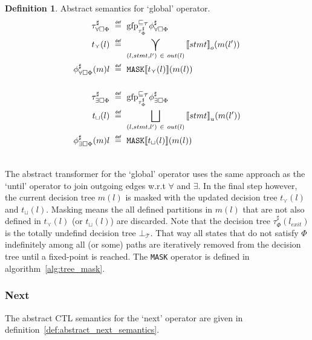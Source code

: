 \documentclass[11pt,a4paper,titlepage]{article}
\theoremstyle{definition}
\newtheorem{definition}{Definition}[section]
\newcommand\eqdef{\mathrel{\overset{\makebox[0pt]{\mbox{\normalfont\tiny\sffamily def}}}{=}}}
\begin{document}
\begin{definition}\label{def:abstract_global_semantics}
    Abstract semantics for `global' operator.
    \setlength{\jot}{15pt}
    \begin{align*}
        \tau^\sharp_{\forall\square\Phi} \ &\eqdef \ \text{gfp}^{\sqsubseteq_{\mathcal{T}}}_{\tau^\sharp_\Phi} \phi^\sharp_{\forall\square\Phi}\\
        t_{\curlyvee}(l)  \ &\eqdef \ \bigcurlyvee\limits_{(l, stmt, l') \ \in \ out(l) } {\llbracket stmt \rrbracket}_{o} ( m(l')) \\
        \phi^\sharp_{\forall\square\Phi}(m)l \ &\eqdef \ \mathtt{MASK}\llbracket t_{\curlyvee}(l)\rrbracket (m(l))  \\\\
        \tau^\sharp_{\exists\square\Phi} \ &\eqdef \ \text{gfp}^{\sqsubseteq_{\mathcal{T}}}_{\tau^\sharp_\Phi} \phi^\sharp_{\exists\square\Phi}\\
        t_{\sqcup}(l)  \ &\eqdef \ \bigsqcup\limits_{(l, stmt, l') \ \in \ out(l) } {\llbracket stmt \rrbracket}_{u} ( m(l')) \\
        \phi^\sharp_{\exists\square\Phi}(m)l \ &\eqdef \ \mathtt{MASK}\llbracket t_{\sqcup}(l) \rrbracket (m(l))  \\\\
    \end{align*}
\end{definition}

The abstract transformer for the `global' operator uses the same approach as the `until' operator to join outgoing edges w.r.t $\forall$ and $\exists$.
In the final step however, the current decision tree $m(l)$ is masked with the updated decision tree $t_{\curlyvee}(l)$ and $t_{\sqcup}(l)$.
Masking means the all defined partitions in $m(l)$ that are not also defined in $t_{\curlyvee}(l)$ (or $t_{\sqcup}(l)$) are discarded. 
Note that the decision tree $\tau^\sharp_\Phi(l_{exit})$ is the totally undefind decision tree $\bot_\mathcal{T}$.
That way all states that do not satisfy $\Phi$ indefinitely among all (or some) paths are iteratively 
removed from the decision tree until a fixed-point is reached. 
The \texttt{MASK} operator is defined in algorithm~\ref{alg:tree_mask}.




\subsubsection*{Next}
The abstract CTL semantics for the `next' operator are given in definition~\ref{def:abstract_next_semantics}. 
\end{document}
